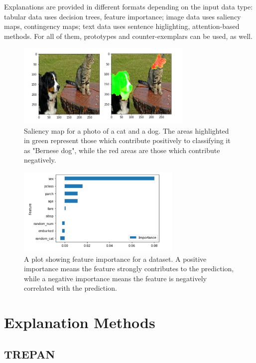 Explanations are provided in different formats depending on the input data type: tabular data uses decision trees, feature importance; image data uses saliency maps, contingency maps; text data uses sentence higlighting, attention-based methods. For all of them, prototypes and counter-exemplars can be used, as well.

\begin{figure}[ht]
    \centering
    \includegraphics[width=0.75\textwidth]{img/saliency_map_dog_cat.png}
    \caption{Saliency map for a photo of a cat and a dog. The areas highlighted in green represent those which contribute positively to classifying it as "Bernese dog", while the red areas are those which contribute negatively.}
\end{figure}
\begin{figure}[ht]
    \centering
    \includegraphics[width=0.70\textwidth]{img/feature_importance.png}
    \caption{A plot showing feature importance for a dataset. A positive importance means the feature strongly contributes to the prediction, while a negative importance means the feature is negatively correlated with the prediction.}
\end{figure}

\section{Explanation Methods}

\subsection{TREPAN}

